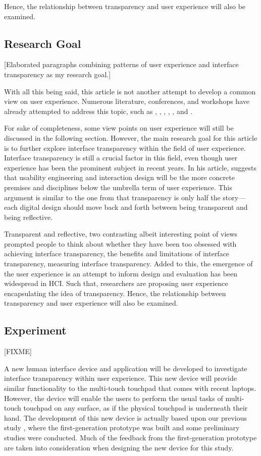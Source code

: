 \documentclass{acm_proc_article-sp}
\begin{document}
Hence, the relationship between transparency and user
experience will also be examined.

\subsection{Research Goal}
[Elaborated paragraphs combining patterns of user experience and
  interface transparency as my research goal.]

With all this being said, this article is not another attempt to
develop a common view on user experience. Numerous literature,
conferences, and workshops have already attempted to address this
topic, such as \citet{early:forlizzi}, \citet{emotional:norman},
\citet{action:dourish}, \citet{ux:hassenzahl},
\citet{experience:desmet}, and \citet{ux:law}.

For sake of completeness, some view points on user experience will
still be discussed in the following section. However, the main
research goal for this article is to further explore interface
transparency within the field of user experience. Interface
transparency is still a crucial factor in this field, even though user
experience has been the prominent subject in recent years. In his
article, \citet{future:memmel} suggests that usability engineering and
interaction design will be the more concrete premises and disciplines
below the umbrella term of user experience. This argument is similar
to the one from \citet{windows:bolter} that transparency is only half
the story---each digital design should move back and forth between
being transparent and being reflective.

Transparent and reflective, two contrasting albeit interesting point
of views prompted people to think about whether they have been too
obsessed with achieving interface transparency, the benefits and
limitations of interface transparency, measuring interface
transparency. Added to this, the emergence of the user experience is
an attempt to inform design and evaluation has been widespread in
HCI. Such that, researchers are proposing user experience
encapsulating the idea of transparency. Hence, the relationship
between transparency and user experience will also be examined.

\subsection{Experiment}
[FIXME]

A new human interface device and application will be developed to
investigate interface transparency within user experience. This new
device will provide similar functionality to the multi-touch touchpad
that comes with recent laptops. However, the device will enable the
users to perform the usual tasks of multi-touch touchpad on any
surface, as if the physical touchpad is underneath their hand. The
development of this new device is actually based upon our previous
study \citep{lmnt:huang}, where the first-generation prototype was
built and some preliminary studies were conducted. Much of the
feedback from the first-generation prototype are taken into
consideration when designing the new device for this study.
\end{document}
